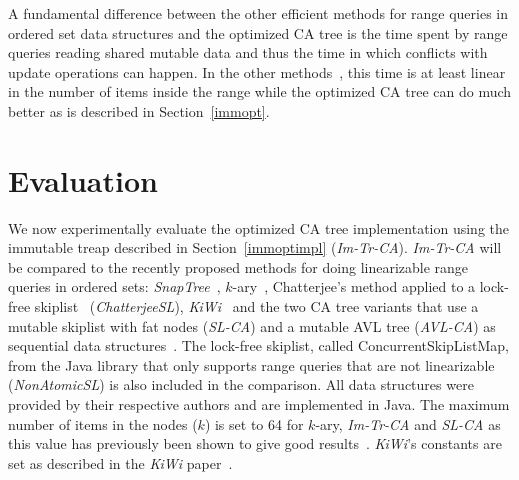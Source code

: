 \documentclass[a4paper,UKenglish]{oasics-v2016}
\newcommand{\kary}{\mbox{$k$-ary}\xspace}
\begin{document}
A fundamental difference between the other efficient methods for range queries in ordered set data structures and the optimized CA tree is the time spent by range queries reading shared mutable data and thus the time in which conflicts with update operations can happen.
In the other methods~\cite{RangeQKArySeachTree,AvniLeaplist,CFRangeQueries,CATreeLCPC,ChatterjeeLFRangeQueries,BasinKiWi}, this time is at least linear in the number of items inside the range while the optimized CA tree can do much better as is described in Section~\ref{immopt}.




\section{Evaluation\label{sec:eval}}
We now experimentally evaluate the optimized CA tree implementation using the immutable treap described in Section~\ref{immoptimpl} (\emph{Im-Tr-CA}).
\emph{Im-Tr-CA} will be compared to the recently proposed methods for doing linearizable range queries in ordered sets: \emph{SnapTree}~\cite{bronson2010practical}, \kary{}~\cite{RangeQKArySeachTree}, Chatterjee's method applied to a lock-free skiplist~\cite{ChatterjeeLFRangeQueries} (\emph{ChatterjeeSL}), \emph{KiWi}~\cite{BasinKiWi} and the two CA tree variants that use a mutable skiplist with fat nodes (\emph{SL-CA}) and a mutable AVL tree (\mbox{\emph{AVL-CA}}) as sequential data structures~\cite{CATreeLCPC}. %
The lock-free skiplist, called ConcurrentSkipListMap, from the Java library that only supports range queries that are not linearizable (\emph{NonAtomicSL}) is also included in the comparison.
All data structures were provided by their respective authors and are implemented in Java.
The maximum number of items in the nodes ($k$) is set to 64 for \kary, \emph{Im-Tr-CA} and \emph{SL-CA} as this value has previously been shown to give good results~\cite{RangeQKArySeachTree}.
\emph{KiWi}'s constants are set as described in the \emph{KiWi} paper~\cite{BasinKiWi}.
\end{document}
